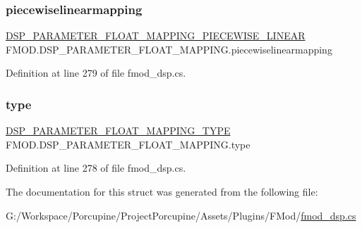 \subsubsection{\texorpdfstring{piecewiselinearmapping}{piecewiselinearmapping}}
{\footnotesize\ttfamily \hyperlink{struct_f_m_o_d_1_1_d_s_p___p_a_r_a_m_e_t_e_r___f_l_o_a_t___m_a_p_p_i_n_g___p_i_e_c_e_w_i_s_e___l_i_n_e_a_r}{D\+S\+P\+\_\+\+P\+A\+R\+A\+M\+E\+T\+E\+R\+\_\+\+F\+L\+O\+A\+T\+\_\+\+M\+A\+P\+P\+I\+N\+G\+\_\+\+P\+I\+E\+C\+E\+W\+I\+S\+E\+\_\+\+L\+I\+N\+E\+AR} F\+M\+O\+D.\+D\+S\+P\+\_\+\+P\+A\+R\+A\+M\+E\+T\+E\+R\+\_\+\+F\+L\+O\+A\+T\+\_\+\+M\+A\+P\+P\+I\+N\+G.\+piecewiselinearmapping}



Definition at line 279 of file fmod\+\_\+dsp.\+cs.

\mbox{\label{struct_f_m_o_d_1_1_d_s_p___p_a_r_a_m_e_t_e_r___f_l_o_a_t___m_a_p_p_i_n_g_aba30eb7f8308eb30680273f2f90458ef}} 
\subsubsection{\texorpdfstring{type}{type}}
{\footnotesize\ttfamily \hyperlink{namespace_f_m_o_d_afd26b4f5904412578911d16a5d3d904f}{D\+S\+P\+\_\+\+P\+A\+R\+A\+M\+E\+T\+E\+R\+\_\+\+F\+L\+O\+A\+T\+\_\+\+M\+A\+P\+P\+I\+N\+G\+\_\+\+T\+Y\+PE} F\+M\+O\+D.\+D\+S\+P\+\_\+\+P\+A\+R\+A\+M\+E\+T\+E\+R\+\_\+\+F\+L\+O\+A\+T\+\_\+\+M\+A\+P\+P\+I\+N\+G.\+type}



Definition at line 278 of file fmod\+\_\+dsp.\+cs.



The documentation for this struct was generated from the following file\+:\begin{DoxyCompactItemize}
\item 
G\+:/\+Workspace/\+Porcupine/\+Project\+Porcupine/\+Assets/\+Plugins/\+F\+Mod/\hyperlink{fmod__dsp_8cs}{fmod\+\_\+dsp.\+cs}\end{DoxyCompactItemize}
